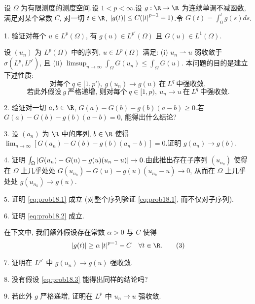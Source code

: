 \begin{problem}[第 3, 4 章]
\label{prob:18}
设 $\Omega$ 为有限测度的测度空间.设 $1<p<\infty$.设 $g:\R\to\R$ 为连续单调不减函数,
满足对某个常数 $C$, 对一切 $t\in\R$, $\left|g(t)\right|\le C(\left|t\right|^{p-1}+1)$.令
$G(t)=\int_0^tg(s)ds$.

1. 验证对每个 $u\in L^p(\Omega)$, 有 $g(u)\in L^{p'}(\Omega)$ 且 $G(u)\in L^1(\Omega)$.

设 $(u_n)$ 为 $L^p(\Omega)$ 中的序列, $u\in L^p(\Omega)$ 满足:
(i) $u_n\rightharpoonup u$ 弱收敛于 $\sigma(L^p,L^{p'})$, 且
(ii) $\limsup_{n\to\infty}\int_\Omega G(u_n)\le\int_\Omega G(u)$.
本问题的目的是建立下述性质:
\begin{equation}
\text{对每个}\ q\in[1,p'),\ g(u_n)\to g(u)\ \text{在}\ L^q\ \text{中强收敛},
\tag{1}
\label{eq:prob18.1}
\end{equation}
\begin{equation}
\text{若此外假设}\ g\ \text{严格递增, 则对每个}\ q\in[1,p),\ u_n\to u\ \text{在}\ L^q\ \text{中强收敛}.
\tag{2}
\label{eq:prob18.2}
\end{equation}

2. 验证对一切 $a,b\in\R$, $G(a)-G(b)-g(b)(a-b)\ge0$.若 $G(a)-G(b)-g(b)(a-b)=0$,
能得出什么结论?

3. 设 $(a_n)$ 为 $\R$ 中的序列, $b\in\R$ 使得
$\lim_{n\to\infty}[G(a_n)-G(b)-g(b)(a_n-b)]=0$.证明 $g(a_n)\to g(b)$.

4. 证明 $\int_\Omega\left|G(u_n)-G(u)-g(u)(u_n-u)\right|\to0$.由此推出存在子序列 $(u_{n_k})$
使得在 $\Omega$ 上几乎处处 $G(u_{n_k})-G(u)-g(u)(u_{n_k}-u)\to0$, 从而在 $\Omega$
上几乎处处 $g(u_{n_k})\to g(u)$.

5. 证明 \eqref{eq:prob18.1} 成立 (对整个序列验证 \eqref{eq:prob18.1}, 而不仅对子序列).

6. 证明 \eqref{eq:prob18.2} 成立.

在下文中, 我们额外假设存在常数 $\alpha>0$ 与 $C$ 使得
\begin{equation}
\abs{g(t)}\ge\alpha\abs{t}^{p-1}-C\quad\forall t\in\R.
\tag{3}
\label{eq:prob18.3}
\end{equation}

7. 证明在 $L^{p'}$ 中 $g(u_n)\to g(u)$ 强收敛.

8. 没有假设 \eqref{eq:prob18.3} 能得出同样的结论吗?

9. 若此外 $g$ 严格递增, 证明在 $L^p$ 中 $u_n\to u$ 强收敛.
\end{problem}

